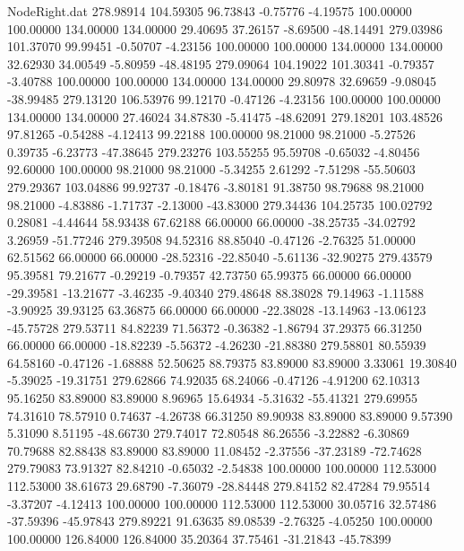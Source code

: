 \begin{filecontents}{NodeRight.dat}
 278.98914  104.59305   96.73843    -0.75776   -4.19575  100.00000  100.00000  134.00000  134.00000   29.40695   37.26157   -8.69500  -48.14491
 279.03986  101.37070   99.99451    -0.50707   -4.23156  100.00000  100.00000  134.00000  134.00000   32.62930   34.00549   -5.80959  -48.48195
 279.09064  104.19022  101.30341    -0.79357   -3.40788  100.00000  100.00000  134.00000  134.00000   29.80978   32.69659   -9.08045  -38.99485
 279.13120  106.53976   99.12170    -0.47126   -4.23156  100.00000  100.00000  134.00000  134.00000   27.46024   34.87830   -5.41475  -48.62091
 279.18201  103.48526   97.81265    -0.54288   -4.12413   99.22188  100.00000   98.21000   98.21000   -5.27526    0.39735   -6.23773  -47.38645
 279.23276  103.55255   95.59708    -0.65032   -4.80456   92.60000  100.00000   98.21000   98.21000   -5.34255    2.61292   -7.51298  -55.50603
 279.29367  103.04886   99.92737    -0.18476   -3.80181   91.38750   98.79688   98.21000   98.21000   -4.83886   -1.71737   -2.13000  -43.83000
 279.34436  104.25735  100.02792     0.28081   -4.44644   58.93438   67.62188   66.00000   66.00000  -38.25735  -34.02792    3.26959  -51.77246
 279.39508   94.52316   88.85040    -0.47126   -2.76325   51.00000   62.51562   66.00000   66.00000  -28.52316  -22.85040   -5.61136  -32.90275
 279.43579   95.39581   79.21677    -0.29219   -0.79357   42.73750   65.99375   66.00000   66.00000  -29.39581  -13.21677   -3.46235   -9.40340
 279.48648   88.38028   79.14963    -1.11588   -3.90925   39.93125   63.36875   66.00000   66.00000  -22.38028  -13.14963  -13.06123  -45.75728
 279.53711   84.82239   71.56372    -0.36382   -1.86794   37.29375   66.31250   66.00000   66.00000  -18.82239   -5.56372   -4.26230  -21.88380
 279.58801   80.55939   64.58160    -0.47126   -1.68888   52.50625   88.79375   83.89000   83.89000    3.33061   19.30840   -5.39025  -19.31751
 279.62866   74.92035   68.24066    -0.47126   -4.91200   62.10313   95.16250   83.89000   83.89000    8.96965   15.64934   -5.31632  -55.41321
 279.69955   74.31610   78.57910     0.74637   -4.26738   66.31250   89.90938   83.89000   83.89000    9.57390    5.31090    8.51195  -48.66730
 279.74017   72.80548   86.26556    -3.22882   -6.30869   70.79688   82.88438   83.89000   83.89000   11.08452   -2.37556  -37.23189  -72.74628
 279.79083   73.91327   82.84210    -0.65032   -2.54838  100.00000  100.00000  112.53000  112.53000   38.61673   29.68790   -7.36079  -28.84448
 279.84152   82.47284   79.95514    -3.37207   -4.12413  100.00000  100.00000  112.53000  112.53000   30.05716   32.57486  -37.59396  -45.97843
 279.89221   91.63635   89.08539    -2.76325   -4.05250  100.00000  100.00000  126.84000  126.84000   35.20364   37.75461  -31.21843  -45.78399

\end{filecontents}
